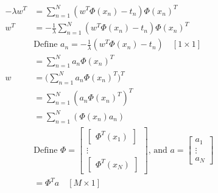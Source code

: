\documentclass[../main.tex]{subfiles}
\begin{document}
\begin{align*}
    -\lambda w^T & = \sum_{n=1}^N (w^T\Phi(x_n) - t_n) \Phi(x_n)^T                                                                                                                                      \\
    w^T          & = -\frac{1}{\lambda} \sum_{n=1}^N (w^T\Phi(x_n) - t_n) \Phi(x_n)^T                                                                                                                   \\
                 & \text{Define } a_n = -\frac{1}{\lambda} (w^T\Phi(x_n) - t_n) \quad [1 \times 1]                                                                                                      \\
                 & = \sum_{n=1}^N a_n \Phi(x_n)^T                                                                                                                                                       \\
    w            & = \bigg( \sum_{n=1}^N a_n \Phi(x_n)^T \bigg)^T                                                                                                                                       \\
                 & = \sum_{n=1}^N (a_n \Phi(x_n)^T)^T                                                                                                                                                   \\
                 & = \sum_{n=1}^N (\Phi(x_n) a_n)                                                                                                                                                       \\
                 & \text{Define } \Phi = \begin{bmatrix}\begin{bmatrix}\Phi^T(x_1)\end{bmatrix}\\ \vdots \\ \begin{bmatrix} \Phi^T(x_N)\end{bmatrix}\end{bmatrix} \text{, and } a=\begin{bmatrix}a_1 \\ \vdots \\ a_N\end{bmatrix} \\
                 & = \Phi^T a \quad [M \times 1]
\end{align*}
\end{document}
